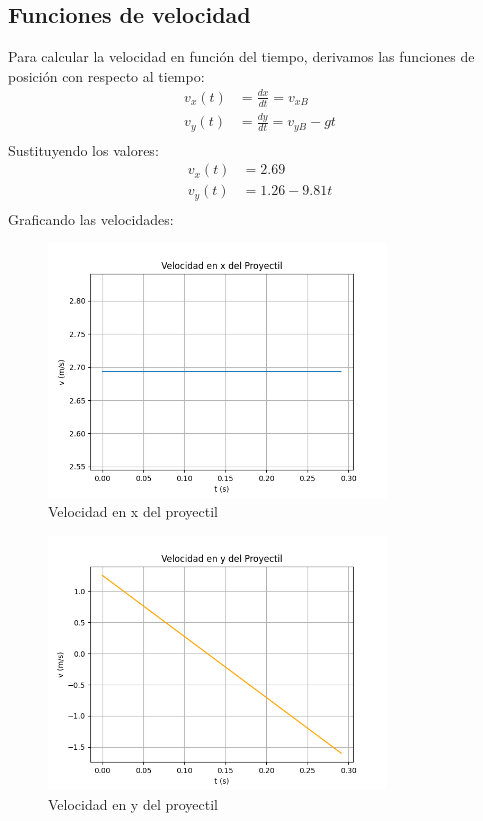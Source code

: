 \documentclass{article}
\begin{document}
        \subsection{Funciones de velocidad}
        Para calcular la velocidad en función del tiempo, derivamos las funciones de posición con respecto al tiempo:
        \begin{align*}
            v_x(t) &= \frac{dx}{dt} = v_{xB} \\
            v_y(t) &= \frac{dy}{dt} = v_{yB} - g t \\
        \end{align*}
        Sustituyendo los valores:
        \begin{align*}
            v_x(t) &= 2.69 \\
            v_y(t) &= 1.26 - 9.81 t \\
        \end{align*}
        Graficando las velocidades:
        \begin{figure}[H]
            \centering
            \includegraphics[width=0.8\textwidth]{figures/velocidad_x.png}
            \caption{Velocidad en x del proyectil}
        \end{figure}
        \begin{figure}[H]
            \centering
            \includegraphics[width=0.8\textwidth]{figures/velocidad_y.png}
            \caption{Velocidad en y del proyectil}
        \end{figure}
        
\end{document}
